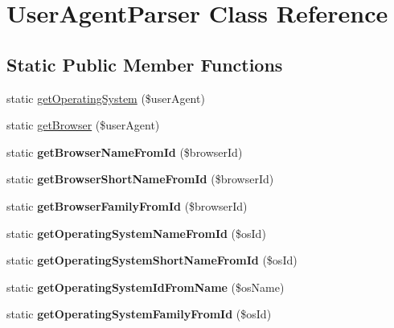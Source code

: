 \hypertarget{class_user_agent_parser}{\section{User\-Agent\-Parser Class Reference}
\label{class_user_agent_parser}
}
\subsection*{Static Public Member Functions}
\begin{DoxyCompactItemize}
\item 
static \hyperlink{class_user_agent_parser_ac435f3d1806cea069a6ca890ab1883c4}{get\-Operating\-System} (\$user\-Agent)
\item 
static \hyperlink{class_user_agent_parser_a54038e0276f884046a26514fd9c262b0}{get\-Browser} (\$user\-Agent)
\item 
\hypertarget{class_user_agent_parser_a62a7a74fe088a35b3f233bf67df2012b}{static {\bfseries get\-Browser\-Name\-From\-Id} (\$browser\-Id)}\label{class_user_agent_parser_a62a7a74fe088a35b3f233bf67df2012b}

\item 
\hypertarget{class_user_agent_parser_a5223fe564aa5f8872c1ad03e2c868b44}{static {\bfseries get\-Browser\-Short\-Name\-From\-Id} (\$browser\-Id)}\label{class_user_agent_parser_a5223fe564aa5f8872c1ad03e2c868b44}

\item 
\hypertarget{class_user_agent_parser_ada5bf3c372bdeafe45c06a5bca1a7cb3}{static {\bfseries get\-Browser\-Family\-From\-Id} (\$browser\-Id)}\label{class_user_agent_parser_ada5bf3c372bdeafe45c06a5bca1a7cb3}

\item 
\hypertarget{class_user_agent_parser_a654d56eac9925308282304e98b6b981e}{static {\bfseries get\-Operating\-System\-Name\-From\-Id} (\$os\-Id)}\label{class_user_agent_parser_a654d56eac9925308282304e98b6b981e}

\item 
\hypertarget{class_user_agent_parser_a0def641c9d57aa4cb3b89672cde82884}{static {\bfseries get\-Operating\-System\-Short\-Name\-From\-Id} (\$os\-Id)}\label{class_user_agent_parser_a0def641c9d57aa4cb3b89672cde82884}

\item 
\hypertarget{class_user_agent_parser_a4a677f5103ebf2631c940c06384adfe4}{static {\bfseries get\-Operating\-System\-Id\-From\-Name} (\$os\-Name)}\label{class_user_agent_parser_a4a677f5103ebf2631c940c06384adfe4}

\item 
\hypertarget{class_user_agent_parser_a7e5b3840ca6c0e2081ac3f41eece3c4e}{static {\bfseries get\-Operating\-System\-Family\-From\-Id} (\$os\-Id)}\label{class_user_agent_parser_a7e5b3840ca6c0e2081ac3f41eece3c4e}

\end{DoxyCompactItemize}

